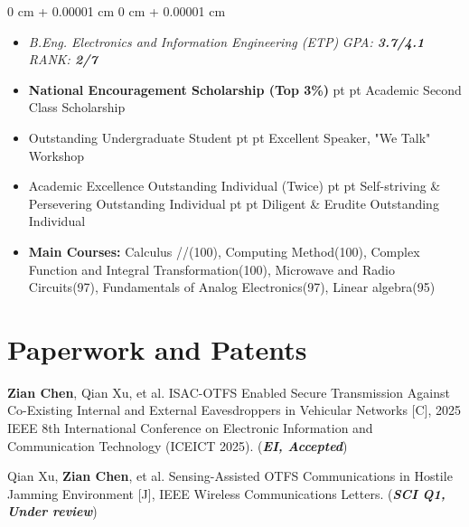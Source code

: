 \documentclass[10pt, letterpaper]{article}
\newenvironment{highlights}{
    \begin{itemize}[
        topsep=0.10 cm,
        parsep=0.10 cm,
        partopsep=0pt,
        itemsep=0pt,
        leftmargin=0 cm + 10pt
    ]
}{
    \end{itemize}
} %
\newenvironment{onecolentry}{
    \begin{adjustwidth}{
        0 cm + 0.00001 cm
    }{
        0 cm + 0.00001 cm
    }
}{
    \end{adjustwidth}
} %
\begin{document}
        \vspace{0.10 cm}
        \begin{onecolentry}
            \begin{highlights}
				\newcommand{\bfit}[1]{\textbf{\textit{#1}}}
				\item \textit{B.Eng. Electronics and Information Engineering (ETP)} \hspace{0.7 cm} \textit{GPA: \bfit{3.7/4.1}} \hspace{0.7 cm} \textit{RANK: \bfit{2/7}}
                \item \textbf{National Encouragement Scholarship (Top 3\%)} pt \AND {} pt  Academic Second Class Scholarship
                \item Outstanding Undergraduate Student pt \AND {} pt Excellent Speaker, "We Talk" Workshop
                \item Academic Excellence Outstanding Individual (Twice) pt \AND {} pt Self-striving \& Persevering Outstanding Individual pt \AND {} pt Diligent \& Erudite Outstanding Individual
                \item \textbf{Main Courses:} Calculus //(100), Computing Method(100),  Complex Function and Integral Transformation(100),  Microwave and Radio Circuits(97), Fundamentals of Analog Electronics(97), Linear algebra(95)
            \end{highlights}
        \end{onecolentry}

    \section{Paperwork and Patents}

        \begin{samepage}
            [$\rm{C_1}$] \textbf{Zian Chen}, Qian Xu, et al. ISAC-OTFS Enabled Secure Transmission Against Co-Existing Internal and External Eavesdroppers in Vehicular Networks [C], 2025 IEEE 8th International Conference on Electronic Information and Communication Technology (ICEICT 2025). (\textbf{\textit{EI, Accepted}})
        \end{samepage}
        
        \vspace{0.20 cm}
        
        \begin{samepage}
            [$\rm{J_1}$] Qian Xu, \textbf{Zian Chen}, et al.  Sensing-Assisted OTFS Communications in Hostile Jamming Environment [J], IEEE Wireless Communications Letters. (\textbf{\textit{SCI Q1, Under review}})
        \end{samepage}
        
\end{document}
